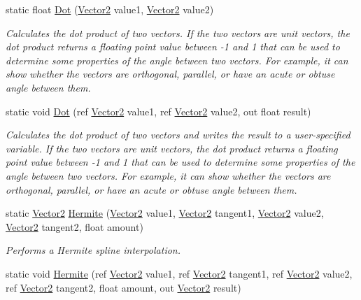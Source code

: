 \begin{DoxyCompactItemize}
static float \hyperlink{structMicrosoft_1_1Xna_1_1Framework_1_1Vector2_a4bd460e9bb57b6ac1a1142fe47cf39cd}{Dot} (\hyperlink{structMicrosoft_1_1Xna_1_1Framework_1_1Vector2}{Vector2} value1, \hyperlink{structMicrosoft_1_1Xna_1_1Framework_1_1Vector2}{Vector2} value2)
\begin{DoxyCompactList}\small\item\em Calculates the dot product of two vectors. If the two vectors are unit vectors, the dot product returns a floating point value between -\/1 and 1 that can be used to determine some properties of the angle between two vectors. For example, it can show whether the vectors are orthogonal, parallel, or have an acute or obtuse angle between them.\end{DoxyCompactList}\item 
static void \hyperlink{structMicrosoft_1_1Xna_1_1Framework_1_1Vector2_a9c0cfedf7eeb62d21d8c9005494cf1bd}{Dot} (ref \hyperlink{structMicrosoft_1_1Xna_1_1Framework_1_1Vector2}{Vector2} value1, ref \hyperlink{structMicrosoft_1_1Xna_1_1Framework_1_1Vector2}{Vector2} value2, out float result)
\begin{DoxyCompactList}\small\item\em Calculates the dot product of two vectors and writes the result to a user-\/specified variable. If the two vectors are unit vectors, the dot product returns a floating point value between -\/1 and 1 that can be used to determine some properties of the angle between two vectors. For example, it can show whether the vectors are orthogonal, parallel, or have an acute or obtuse angle between them.\end{DoxyCompactList}\item 
static \hyperlink{structMicrosoft_1_1Xna_1_1Framework_1_1Vector2}{Vector2} \hyperlink{structMicrosoft_1_1Xna_1_1Framework_1_1Vector2_a31f5a32fc7f1f91369c32f6dbad422e3}{Hermite} (\hyperlink{structMicrosoft_1_1Xna_1_1Framework_1_1Vector2}{Vector2} value1, \hyperlink{structMicrosoft_1_1Xna_1_1Framework_1_1Vector2}{Vector2} tangent1, \hyperlink{structMicrosoft_1_1Xna_1_1Framework_1_1Vector2}{Vector2} value2, \hyperlink{structMicrosoft_1_1Xna_1_1Framework_1_1Vector2}{Vector2} tangent2, float amount)
\begin{DoxyCompactList}\small\item\em Performs a Hermite spline interpolation.\end{DoxyCompactList}\item 
static void \hyperlink{structMicrosoft_1_1Xna_1_1Framework_1_1Vector2_a1b5b24d972b0a0fbcb23c0047d33bfd6}{Hermite} (ref \hyperlink{structMicrosoft_1_1Xna_1_1Framework_1_1Vector2}{Vector2} value1, ref \hyperlink{structMicrosoft_1_1Xna_1_1Framework_1_1Vector2}{Vector2} tangent1, ref \hyperlink{structMicrosoft_1_1Xna_1_1Framework_1_1Vector2}{Vector2} value2, ref \hyperlink{structMicrosoft_1_1Xna_1_1Framework_1_1Vector2}{Vector2} tangent2, float amount, out \hyperlink{structMicrosoft_1_1Xna_1_1Framework_1_1Vector2}{Vector2} result)

\end{DoxyCompactItemize}
